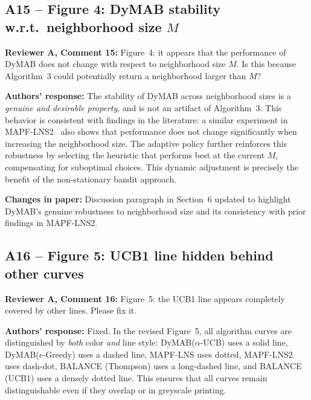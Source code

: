 \documentclass[review]{jair}
\begin{document}
\subsection*{A15 -- Figure 4: DyMAB stability w.r.t.\ neighborhood size $M$}

\begin{reviewerbox}
\textbf{Reviewer A, Comment 15:} Figure~4: it appears that the performance of DyMAB does not change with respect to neighborhood size $M$. Is this because Algorithm~3 could potentially return a neighborhood larger than $M$?
\end{reviewerbox}

\begin{authorbox}
\textbf{Authors' response:} The stability of DyMAB across neighborhood sizes is a \emph{genuine and desirable property}, and is not an artifact of Algorithm~3. This behavior is consistent with findings in the literature: a similar experiment in MAPF-LNS2~\citep{LNS2} also shows that performance does not change significantly when increasing the neighborhood size. The adaptive policy further reinforces this robustness by selecting the heuristic that performs best at the current $M$, compensating for suboptimal choices. This dynamic adjustment is precisely the benefit of the non-stationary bandit approach.
\end{authorbox}

\begin{changebox}
\textbf{Changes in paper:} Discussion paragraph in Section~6 updated to highlight DyMAB's genuine robustness to neighborhood size and its consistency with prior findings in MAPF-LNS2.
\end{changebox}

\subsection*{A16 -- Figure 5: UCB1 line hidden behind other curves}

\begin{reviewerbox}
\textbf{Reviewer A, Comment 16:} Figure~5: the UCB1 line appears completely covered by other lines. Please fix it.
\end{reviewerbox}

\begin{authorbox}
\textbf{Authors' response:} Fixed. In the revised Figure~5, all algorithm curves are distinguished by \emph{both} color \emph{and} line style: DyMAB($\alpha$-UCB) uses a solid line, DyMAB($\epsilon$-Greedy) uses a dashed line, MAPF-LNS uses dotted, MAPF-LNS2 uses dash-dot, BALANCE (Thompson) uses a long-dashed line, and BALANCE (UCB1) uses a densely dotted line. This ensures that all curves remain distinguishable even if they overlap or in greyscale printing.
\end{authorbox}
\end{document}
